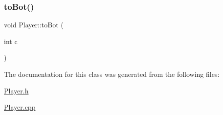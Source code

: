 \mbox{\label{class_player_aadaa98941bffa5f85269786929fddcd1}} 
\subsubsection{\texorpdfstring{to\+Bot()}{toBot()}}
{\footnotesize\ttfamily void Player\+::to\+Bot (\begin{DoxyParamCaption}\item[{int}]{c }\end{DoxyParamCaption})}



The documentation for this class was generated from the following files\+:\begin{DoxyCompactItemize}
\item 
\mbox{\hyperlink{_player_8h}{Player.\+h}}\item 
\mbox{\hyperlink{_player_8cpp}{Player.\+cpp}}\end{DoxyCompactItemize}
